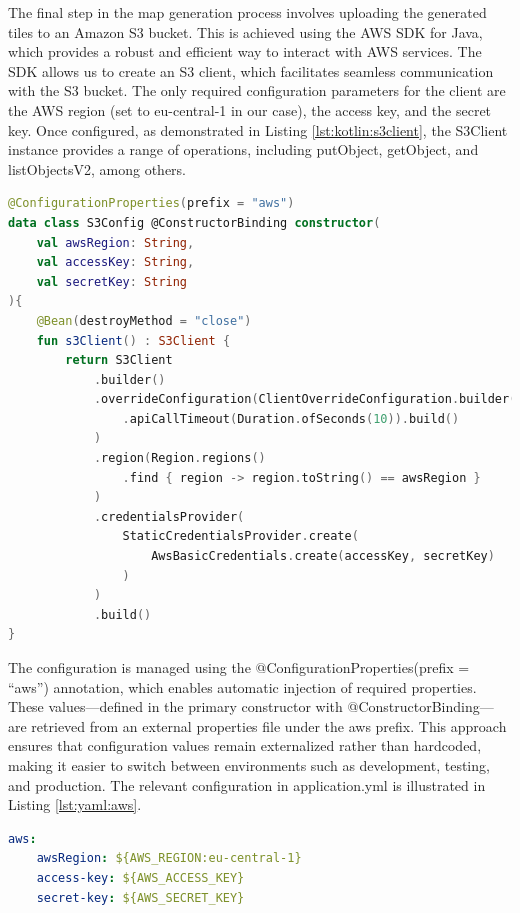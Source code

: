 The final step in the map generation process involves uploading the generated tiles to an Amazon S3 bucket. This is achieved using the AWS SDK for Java, which provides a robust and efficient way to interact with AWS services. The SDK allows us to create an S3 client, which facilitates seamless communication with the S3 bucket. The only required configuration parameters for the client are the AWS region (set to eu-central-1 in our case), the access key, and the secret key. Once configured, as demonstrated in Listing \ref{lst:kotlin:s3client}, the S3Client instance provides a range of operations, including putObject, getObject, and listObjectsV2, among others.

\begin{lstlisting}[language=Kotlin,caption=Configuring the S3 Client,label=lst:kotlin:s3client]
@ConfigurationProperties(prefix = "aws")
data class S3Config @ConstructorBinding constructor(
    val awsRegion: String,
    val accessKey: String,
    val secretKey: String
){
    @Bean(destroyMethod = "close")
    fun s3Client() : S3Client {
        return S3Client
            .builder()
            .overrideConfiguration(ClientOverrideConfiguration.builder()
                .apiCallTimeout(Duration.ofSeconds(10)).build()
            )
            .region(Region.regions()
                .find { region -> region.toString() == awsRegion }
            )
            .credentialsProvider(
                StaticCredentialsProvider.create(
                    AwsBasicCredentials.create(accessKey, secretKey)
                )
            )
            .build()
}
\end{lstlisting}

The configuration is managed using the @ConfigurationProperties(prefix = ``aws'') annotation, which enables automatic injection of required properties. These values—defined in the primary constructor with @ConstructorBinding—are retrieved from an external properties file under the aws prefix. This approach ensures that configuration values remain externalized rather than hardcoded, making it easier to switch between environments such as development, testing, and production. The relevant configuration in application.yml is illustrated in Listing \ref{lst:yaml:aws}.
\begin{lstlisting}[language=Yaml, caption=AWS Configuration in application.yml, label=lst:yaml:aws]
aws:
    awsRegion: ${AWS_REGION:eu-central-1}
    access-key: ${AWS_ACCESS_KEY}
    secret-key: ${AWS_SECRET_KEY}
\end{lstlisting}

